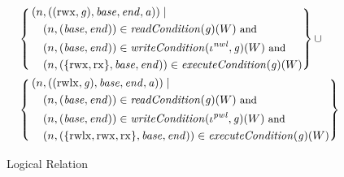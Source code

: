 \documentclass[compsoc,conference,letterpaper,fleqn]{IEEEtran}
\newcommand{\union}{\mathbin{\cup}}
\newcommand{\var}[1]{\mathit{#1}}
\newcommand{\gl}{\var{g}}
\newcommand{\addr}{\var{a}}
\newcommand{\start}{\var{base}}
\newcommand{\addrend}{\var{end}}
\newcommand{\perm}{\var{perm}}
\newcommand{\stdcap}[1][(\perm,\gl)]{\left(#1,\start,\addrend,\addr \right)}
\newcommand{\nwl}{\var{nwl}}
\newcommand{\pwl}{\var{pwl}}
\newcommand{\plainfun}[2]{
  \ifthenelse{\equal{#2}{}}
  {\mathit{#1}}
  {\mathit{#1}(#2)}
}
\newcommand{\readCond}[1]{\plainfun{readCondition}{#1}}
\newcommand{\writeCond}[1]{\plainfun{writeCondition}{#1}}
\newcommand{\execCond}[1]{\plainfun{executeCondition}{#1}}
\newcommand{\npair}[2][n]{\left(#1,#2 \right)}
\newcommand{\plainperm}[1]{\mathrm{#1}}
\newcommand{\exec}{\plainperm{rx}}
\newcommand{\rwx}{\plainperm{rwx}}
\newcommand{\rwlx}{\plainperm{rwlx}}
\newlength{\oldmathindent}
\newenvironment{withmathindent}[1]{\setlength{\oldmathindent}{\mathindent}\setlength{\mathindent}{#1}}{\setlength{\mathindent}{\oldmathindent}}
\begin{document}
{\begin{figure}[htbp]
\begin{withmathindent}{0cm}
\begin{align*}
\begin{aligned}[t]
        & \left\{
          \begin{aligned}
            &\npair{\stdcap[(\rwx,\gl)]} \mid \\
            &\quad\npair{(\start,\addrend)} \in \readCond{}(\gl)(W) \text{\footnotesize{ and }} \\
            &\quad\npair{(\start,\addrend)} \in \writeCond{}(\iota^\nwl,\gl)(W) \text{\footnotesize{ and }}\\
            &\quad\npair{(\{\rwx,\exec\},\start,\addrend)} \in \execCond{}(\gl)(W)
          \end{aligned} \right\}
        \union \\
        & \left\{
          \begin{aligned}
            &\npair{\stdcap[(\rwlx,\gl)]} \mid \\
             &\quad\npair{(\start,\addrend)} \in \readCond{}(\gl)(W) \text{\footnotesize{ and }} \\
             &\quad\npair{(\start,\addrend)} \in \writeCond{}(\iota^\pwl,\gl)(W) \text{\footnotesize{ and }}\\
             &\quad\npair{(\{\rwlx,\rwx,\exec\},\start,\addrend)} \in
            \execCond{}(\gl)(W)
          \end{aligned} \right\}
      \end{aligned}
    \end{align*}
  \end{withmathindent}
  \caption{Logical Relation}
  \label{fig:logrel}            
\end{figure}

}
\end{document}
